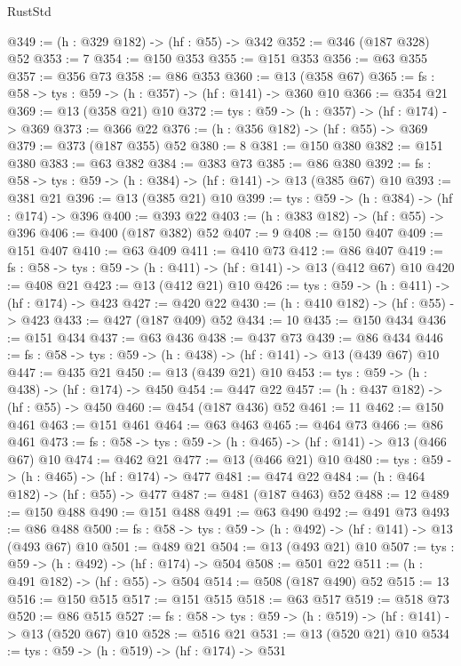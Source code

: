 \begin{lexlean}{RustStd}
\begin{coremodule}
@349 := (h : @329 @182) -> (hf : @55) -> @342
@352 := @346 (@187 @328) @52
@353 := 7
@354 := @150 @353
@355 := @151 @353
@356 := @63 @355
@357 := @356 @73
@358 := @86 @353
@360 := @13 (@358 @67)
@365 := {fs : @58} -> {tys : @59} -> (h : @357) -> (hf : @141) -> @360 @10
@366 := @354 @21
@369 := @13 (@358 @21) @10
@372 := {tys : @59} -> (h : @357) -> (hf : @174) -> @369
@373 := @366 @22
@376 := (h : @356 @182) -> (hf : @55) -> @369
@379 := @373 (@187 @355) @52
@380 := 8
@381 := @150 @380
@382 := @151 @380
@383 := @63 @382
@384 := @383 @73
@385 := @86 @380
@392 := {fs : @58} -> {tys : @59} -> (h : @384) -> (hf : @141) -> @13 (@385 @67) @10
@393 := @381 @21
@396 := @13 (@385 @21) @10
@399 := {tys : @59} -> (h : @384) -> (hf : @174) -> @396
@400 := @393 @22
@403 := (h : @383 @182) -> (hf : @55) -> @396
@406 := @400 (@187 @382) @52
@407 := 9
@408 := @150 @407
@409 := @151 @407
@410 := @63 @409
@411 := @410 @73
@412 := @86 @407
@419 := {fs : @58} -> {tys : @59} -> (h : @411) -> (hf : @141) -> @13 (@412 @67) @10
@420 := @408 @21
@423 := @13 (@412 @21) @10
@426 := {tys : @59} -> (h : @411) -> (hf : @174) -> @423
@427 := @420 @22
@430 := (h : @410 @182) -> (hf : @55) -> @423
@433 := @427 (@187 @409) @52
@434 := 10
@435 := @150 @434
@436 := @151 @434
@437 := @63 @436
@438 := @437 @73
@439 := @86 @434
@446 := {fs : @58} -> {tys : @59} -> (h : @438) -> (hf : @141) -> @13 (@439 @67) @10
@447 := @435 @21
@450 := @13 (@439 @21) @10
@453 := {tys : @59} -> (h : @438) -> (hf : @174) -> @450
@454 := @447 @22
@457 := (h : @437 @182) -> (hf : @55) -> @450
@460 := @454 (@187 @436) @52
@461 := 11
@462 := @150 @461
@463 := @151 @461
@464 := @63 @463
@465 := @464 @73
@466 := @86 @461
@473 := {fs : @58} -> {tys : @59} -> (h : @465) -> (hf : @141) -> @13 (@466 @67) @10
@474 := @462 @21
@477 := @13 (@466 @21) @10
@480 := {tys : @59} -> (h : @465) -> (hf : @174) -> @477
@481 := @474 @22
@484 := (h : @464 @182) -> (hf : @55) -> @477
@487 := @481 (@187 @463) @52
@488 := 12
@489 := @150 @488
@490 := @151 @488
@491 := @63 @490
@492 := @491 @73
@493 := @86 @488
@500 := {fs : @58} -> {tys : @59} -> (h : @492) -> (hf : @141) -> @13 (@493 @67) @10
@501 := @489 @21
@504 := @13 (@493 @21) @10
@507 := {tys : @59} -> (h : @492) -> (hf : @174) -> @504
@508 := @501 @22
@511 := (h : @491 @182) -> (hf : @55) -> @504
@514 := @508 (@187 @490) @52
@515 := 13
@516 := @150 @515
@517 := @151 @515
@518 := @63 @517
@519 := @518 @73
@520 := @86 @515
@527 := {fs : @58} -> {tys : @59} -> (h : @519) -> (hf : @141) -> @13 (@520 @67) @10
@528 := @516 @21
@531 := @13 (@520 @21) @10
@534 := {tys : @59} -> (h : @519) -> (hf : @174) -> @531

\end{coremodule}
\end{lexlean}
